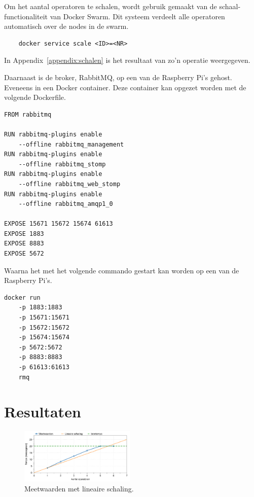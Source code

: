 \documentclass[twocolumn, a4paper]{article}
\begin{document}
Om het aantal operatoren te schalen, wordt gebruik gemaakt van de schaal-functionaliteit van Docker Swarm. Dit systeem verdeelt alle operatoren automatisch over de nodes in de swarm.
 
\begin{verbatim}
    docker service scale <ID>=<NR>
\end{verbatim}

In Appendix~\ref{appendix:schalen} is het resultaat van zo'n operatie weergegeven. 

Daarnaast is de broker, RabbitMQ, op een van de Raspberry Pi's gehost. Eveneens in een Docker container. Deze container kan opgezet worden met de volgende Dockerfile.  

\begin{verbatim}
FROM rabbitmq

RUN rabbitmq-plugins enable 
    --offline rabbitmq_management
RUN rabbitmq-plugins enable 
    --offline rabbitmq_stomp
RUN rabbitmq-plugins enable
    --offline rabbitmq_web_stomp
RUN rabbitmq-plugins enable 
    --offline rabbitmq_amqp1_0

EXPOSE 15671 15672 15674 61613
EXPOSE 1883
EXPOSE 8883
EXPOSE 5672
\end{verbatim}

Waarna het met het volgende commando gestart kan worden op een van de Raspberry Pi's. 
\begin{verbatim}
docker run  
    -p 1883:1883 
    -p 15671:15671 
    -p 15672:15672 
    -p 15674:15674 
    -p 5672:5672 
    -p 8883:8883 
    -p 61613:61613 
    rmq
\end{verbatim}

\section{Resultaten}
\begin{figure}[b]
    \centering
    \includegraphics[width=0.49\textwidth]{metingen}
    \caption{Meetwaarden met lineaire schaling.}\label{fig:metingen}
\end{figure}
\end{document}

